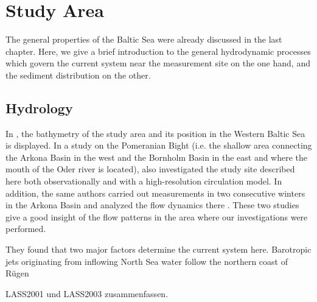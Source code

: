 \section{Study Area}

The general properties of the Baltic Sea were already discussed in the last 
chapter. Here, we give a brief introduction to the general hydrodynamic 
processes which govern the current system near the measurement site on the one 
hand, and the sediment distribution on the other.

\subsection{Hydrology}

In , the bathymetry of the study area and its position in the 
Western Baltic Sea is displayed. In a study on the Pomeranian Bight (i.e. the 
shallow area connecting the Arkona Basin in the west and the Bornholm Basin in 
the east and where the mouth of the Oder river is located), \cite{lass2001} 
also investigated the study site described here both observationally and with a 
high-resolution circulation model. In addition, the same authors carried out 
measurements in two consecutive winters in the Arkona Basin and analyzed the 
flow dynamics there \citep[][]{lass2003}. These two studies give a good insight 
of the flow patterns in the area where our investigations were performed.

They found that two major factors determine the current system here. Barotropic 
jets originating from inflowing North Sea water follow the northern coast of 
R\"{u}gen 

LASS2001 und LASS2003 zusammenfassen.

